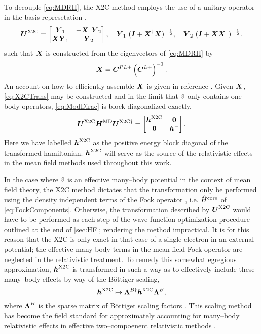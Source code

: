 To decouple \cref{eq:MDRH},
the X2C method employs the use of a unitary operator in the basis represetation ,
\begin{equation}
\label{eq:X2CTrans}
\boldsymbol{U}^{\mathrm{X2C}} = \begin{bmatrix} \boldsymbol{Y}_1 & - \boldsymbol{X}^\dagger \boldsymbol{Y}_2 \\ \boldsymbol{X} \boldsymbol{Y}_1 & \boldsymbol{Y}_2 \end{bmatrix},
\quad \boldsymbol{Y}_1 \ (\boldsymbol{I} + \boldsymbol{X}^\dagger \boldsymbol{X})^{-\frac{1}{2}},  
\quad \boldsymbol{Y}_2 \ (\boldsymbol{I} + \boldsymbol{X} \boldsymbol{X}^\dagger)^{-\frac{1}{2}}.  
\end{equation}
such that $\boldsymbol{X}$ is constructed from the eigenvectors of \cref{eq:MDRH} by
\begin{equation}
\boldsymbol{X} = \boldsymbol{C}^{PL+} \left(\boldsymbol{C}^{L+}\right)^{-1}.
\end{equation}
An account on how to efficiently assemble $\boldsymbol{X}$ is given in reference .
Given $\boldsymbol{X}$, \cref{eq:X2CTrans} may 
be constructed and in the limit that $\hat{v}$ only contains one body operators, \cref{eq:ModDirac} is block diagonalized 
exactly,
\begin{equation}
\boldsymbol{U}^{\mathrm{X2C}} \boldsymbol{H}^\mathrm{MD} \boldsymbol{U}^{\mathrm{X2C}\dagger} = \begin{bmatrix} \boldsymbol{h}^{\mathrm{X2C}} & \boldsymbol{0} \\ \boldsymbol{0} & \boldsymbol{h}^- \end{bmatrix}.
\end{equation}
Here we have labelled $\boldsymbol{h}^{\mathrm{X2C}}$ as the positive energy block diagonal of the transformed hamiltonian. $\boldsymbol{h}^{\mathrm{X2C}}$ 
will serve as the source of the relativistic effects in the mean field methods used throughout this work.

In the case where $\hat{v}$ is an effective many--body potential in the context of mean field theory, the X2C method
dictates that the transformation only be performed using the density independent terms of the Fock operator ,
i.e. $\hat{H}^\mathrm{core}$ of \cref{eq:FockComponents}. Otherwise, the transformation described by $\boldsymbol{U}^{\mathrm{X2C}}$ would
have to be performed as each step of the wave function optimization procedure outlined at the end  of \cref{sec:HF};
rendering the method impractical. It is for this reason that the X2C is only exact in that case of a single electron
in an external potential; the effective many body terms in the mean field Fock operator are neglected in the 
relativistic treatment. To remedy this somewhat egregious approximation, $\boldsymbol{h}^{\mathrm{X2C}}$ is transformed in such a
way as to effectively include these many--body effects by way of the B\"{o}ttiger  scaling,
\begin{equation}
\boldsymbol{h}^{\mathrm{X2C}} \mapsto \boldsymbol{\Lambda}^{B\dagger} \boldsymbol{h}^{\mathrm{X2C}} \boldsymbol{\Lambda}^{B},
\end{equation}
where $\boldsymbol{\Lambda}^B$ is the sparse matrix of B\"{o}ttiget scaling factors . This scaling method
has become the field standard for approximately accounting for many--body relativistic effects in effective
two--compoenent relativistic methods .

